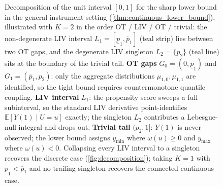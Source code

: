 \begin{figure}[!htbp]
\caption{Decomposition of the unit interval $[0,1]$ for the sharp lower bound in the general instrument setting (\cref{thm:continuous_lower_bound}), illustrated with $K=2$ in the order OT / LIV / OT / trivial: the non-degenerate LIV interval $L_1 = [\underline{p}_1, \overline{p}_1]$ (teal strip) lies between two OT gaps, and the degenerate LIV singleton $L_2 = \{p_2\}$ (teal line) sits at the boundary of the trivial tail. \textbf{\color{blue!65}OT gaps} $G_0 = (0, \underline{p}_1)$ and $G_1 = (\overline{p}_1, p_2)$: only the aggregate distributions $\mu_{1,0}, \mu_{1,1}$ are identified, so the tight bound requires countermonotone quantile coupling. \textbf{\color{teal!65}LIV interval} $L_1$: the propensity score sweeps a full subinterval, so the standard LIV derivative point-identifies $\mathbb{E}[Y(1)\mid U=u]$ exactly; the singleton $L_2$ contributes a Lebesgue-null integral and drops out. \textbf{\color{orange!65}Trivial tail} $(p_2, 1]$: $Y(1)$ is never observed; the lower bound assigns $y_{\min}$ where $\omega(u)\geqslant 0$ and $y_{\max}$ where $\omega(u)<0$. Collapsing every LIV interval to a singleton recovers the discrete case (\cref{fig:decomposition}); taking $K=1$ with $\underline{p}_1<\overline{p}_1$ and no trailing singleton recovers the connected-continuous case.}
\label{fig:continuous_decomposition}
\end{figure}


